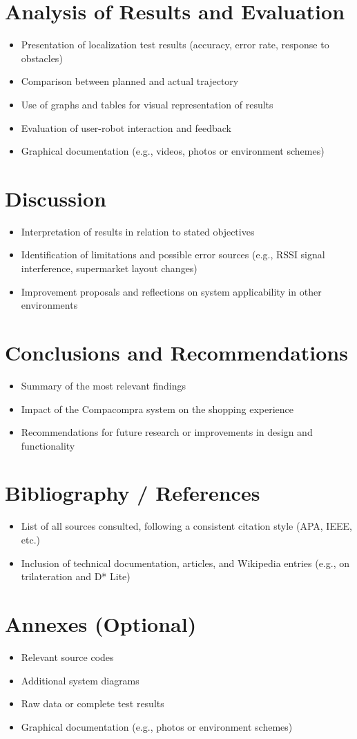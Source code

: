 \documentclass[a4paper,12pt]{article}
\begin{document}
\section{Analysis of Results and Evaluation}
\begin{itemize}
\item Presentation of localization test results (accuracy, error rate, response to obstacles)
\item Comparison between planned and actual trajectory
\item Use of graphs and tables for visual representation of results
\item Evaluation of user-robot interaction and feedback
\item Graphical documentation (e.g., videos, photos or environment schemes)
\end{itemize}

\section{Discussion}
\begin{itemize}
\item Interpretation of results in relation to stated objectives
\item Identification of limitations and possible error sources (e.g., RSSI signal interference, supermarket layout changes)
\item Improvement proposals and reflections on system applicability in other environments
\end{itemize}
\section{Conclusions and Recommendations}
\begin{itemize}
\item Summary of the most relevant findings
\item Impact of the Compacompra system on the shopping experience
\item Recommendations for future research or improvements in design and functionality
\end{itemize}

\section{Bibliography / References}
\begin{itemize}
\item List of all sources consulted, following a consistent citation style (APA, IEEE, etc.)
\item Inclusion of technical documentation, articles, and Wikipedia entries (e.g., on trilateration and D* Lite)
\end{itemize}

\section{Annexes (Optional)}
\begin{itemize}
\item Relevant source codes
\item Additional system diagrams
\item Raw data or complete test results
\item Graphical documentation (e.g., photos or environment schemes)
\end{itemize}
\end{document}
